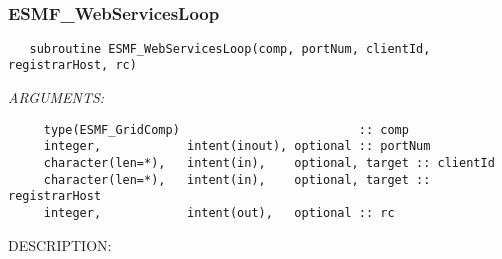  
\setlength{\oldparskip}{\parskip}
\setlength{\parskip}{1.5ex}
\setlength{\oldparindent}{\parindent}
\setlength{\parindent}{0pt}
\setlength{\oldbaselineskip}{\baselineskip}
\setlength{\baselineskip}{11pt}
 
\def\bv{\begin{verbatim}}
\def\ev{\end{verbatim}}
\def\be{\begin{equation}}
\def\ee{\end{equation}}
\def\bea{\begin{eqnarray}}
\def\eea{\end{eqnarray}}
\def\bi{\begin{itemize}}
\def\ei{\end{itemize}}
\def\bn{\begin{enumerate}}
\def\en{\end{enumerate}}
\def\bd{\begin{description}}
\def\ed{\end{description}}
\def\({\left (}
\def\){\right )}
\def\[{\left [}
\def\]{\right ]}
\def\<{\left  \langle}
\def\>{\right \rangle}
\def\cI{{\cal I}}
\def\diag{\mathop{\rm diag}}
\def\tr{\mathop{\rm tr}}


 

  
 
\mbox{}\hrulefill\ 
 
\subsubsection [ESMF\_WebServicesLoop] {ESMF\_WebServicesLoop }


  
\begin{verbatim}   subroutine ESMF_WebServicesLoop(comp, portNum, clientId, registrarHost, rc)
 \end{verbatim}{\em ARGUMENTS:}
\begin{verbatim}     type(ESMF_GridComp)                         :: comp
     integer,            intent(inout), optional :: portNum
     character(len=*),   intent(in),    optional, target :: clientId
     character(len=*),   intent(in),    optional, target :: registrarHost
     integer,            intent(out),   optional :: rc\end{verbatim}
{\sf DESCRIPTION:\\ }


